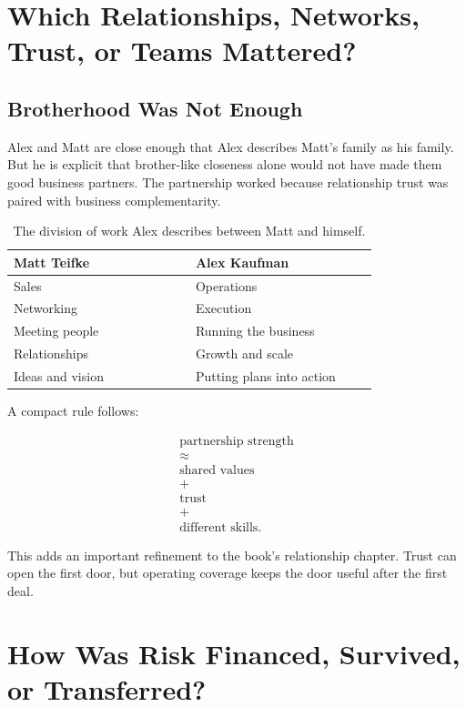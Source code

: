 \documentclass[11pt,oneside]{book}
\begin{document}
\chapter{Which Relationships, Networks, Trust, or Teams Mattered?}

\section{Brotherhood Was Not Enough}

Alex and Matt are close enough that Alex describes Matt's family as his family. But he is explicit that brother-like closeness alone would not have made them good business partners. The partnership worked because relationship trust was paired with business complementarity.

\begin{table}
\centering
\begin{tabular}{|p{0.42\linewidth}|p{0.42\linewidth}|}
\hline
Matt Teifke & Alex Kaufman \\
\hline
Sales & Operations \\
Networking & Execution \\
Meeting people & Running the business \\
Relationships & Growth and scale \\
Ideas and vision & Putting plans into action \\
\hline
\end{tabular}
\caption{The division of work Alex describes between Matt and himself.}
\end{table}

A compact rule follows:

\begin{equation}
\begin{gathered}
\text{partnership strength}\\
\approx\\
\text{shared values}\\
+\\
\text{trust}\\
+\\
\text{different skills}.
\end{gathered}
\end{equation}

This adds an important refinement to the book's relationship chapter. Trust can open the first door, but operating coverage keeps the door useful after the first deal.

\chapter{How Was Risk Financed, Survived, or Transferred?}
\end{document}
